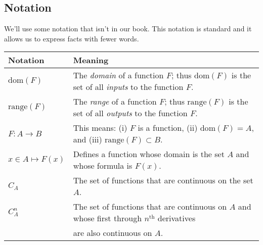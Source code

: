 \documentclass[12pt]{article}
\newcommand{\dom}{\mathrm{dom}}
\newcommand{\range}{\mathrm{range}}
\begin{document}
\subsection*{Notation}

We'll use some notation that isn't in our book. This notation is
standard and it allows us to express facts with fewer words.  

\vspace{0.1in}

\begin{tabular}{|l | l |} \hline 
\textbf{Notation}& \textbf{Meaning} \\ \hline
    $\dom(F)$  &  The \emph{domain} of a function $F$;   thus $\dom(F)$  is the set of all \emph{inputs} to 
                          the function $F$. \\  \hline
    
    $\range(F)$  & The \emph{range} of a function   $F$; thus  $\range(F) $ is  
                           the set of all \emph{outputs} to the function $F$.\\ \hline
                          
   $F : A \to B$ & This means: (i) $F$ is a function, (ii) $\dom(F) = A$, and (iii)  $\range(F) \subset B$. \\ \hline                        
                           
                          
 $ x \in A \mapsto F(x)$  & Defines a function whose domain is the set $A$ and whose formula is $ F(x)$. \\  \hline
 
$  C_A $ &  The set of functions that are continuous on the set $A$. \\  \hline


$ C_A^n$  &  The set of functions that are continuous on $A$ and whose first through $n^{\mbox{th}}$ derivatives \\
                   &    are also continuous on $A$. \\  \hline        
                   

                   
\end{tabular}
\end{document}

